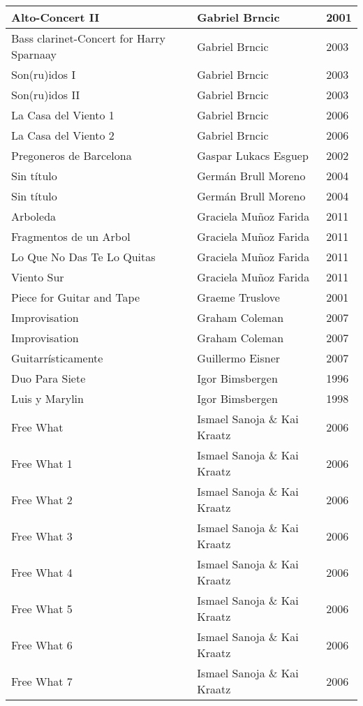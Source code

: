 \begin{center}
\begin{longtable}{ p{}  p{}  p{} }
Alto-Concert II & Gabriel Brncic & 2001 \\ \midrule 
Bass clarinet-Concert for Harry Sparnaay & Gabriel Brncic & 2003 \\ \midrule 
Son(ru)idos I & Gabriel Brncic & 2003 \\ \midrule 
Son(ru)idos II & Gabriel Brncic & 2003 \\ \midrule 
La Casa del Viento 1 & Gabriel Brncic & 2006 \\ \midrule 
La Casa del Viento 2 & Gabriel Brncic & 2006 \\ \midrule 
Pregoneros de Barcelona & Gaspar Lukacs Esguep & 2002 \\ \midrule 
Sin título & Germán Brull Moreno & 2004 \\ \midrule 
Sin título & Germán Brull Moreno & 2004 \\ \midrule 
Arboleda & Graciela Muñoz Farida & 2011 \\ \midrule 
Fragmentos de un Arbol & Graciela Muñoz Farida & 2011 \\ \midrule 
Lo Que No Das Te Lo Quitas & Graciela Muñoz Farida & 2011 \\ \midrule 
Viento Sur & Graciela Muñoz Farida & 2011 \\ \midrule 
Piece for Guitar and Tape & Graeme Truslove & 2001 \\ \midrule 
Improvisation & Graham Coleman & 2007 \\ \midrule 
Improvisation & Graham Coleman & 2007 \\ \midrule 
Guitarrísticamente & Guillermo Eisner & 2007 \\ \midrule 
Duo Para Siete & Igor Bimsbergen & 1996 \\ \midrule 
Luis y Marylin & Igor Bimsbergen & 1998 \\ \midrule 
Free What & Ismael Sanoja \& Kai Kraatz & 2006 \\ \midrule 
Free What 1 & Ismael Sanoja \& Kai Kraatz & 2006 \\ \midrule 
Free What 2 & Ismael Sanoja \& Kai Kraatz & 2006 \\ \midrule 
Free What 3 & Ismael Sanoja \& Kai Kraatz & 2006 \\ \midrule 
Free What 4 & Ismael Sanoja \& Kai Kraatz & 2006 \\ \midrule 
Free What 5 & Ismael Sanoja \& Kai Kraatz & 2006 \\ \midrule 
Free What 6 & Ismael Sanoja \& Kai Kraatz & 2006 \\ \midrule 
Free What 7 & Ismael Sanoja \& Kai Kraatz & 2006 \\ \midrule 

\end{longtable}
\end{center}
